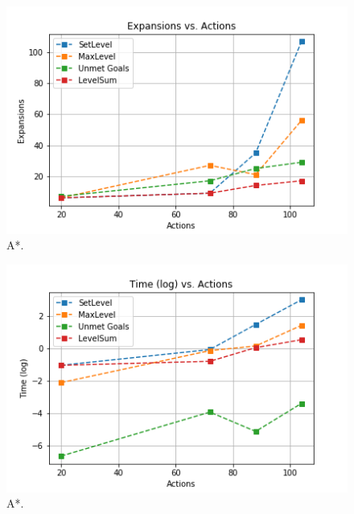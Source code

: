 \documentclass[a4paper]{article}
\begin{document}

\begin{figure}[htpb]
\begin{center}
\includegraphics[width=1\columnwidth]{fig/results_034.png}
\caption{A*.}
\end{center}
\label{fig034}
\end{figure}
        


\begin{figure}[htpb]
\begin{center}
\includegraphics[width=1\columnwidth]{fig/results_031.png}
\caption{A*.}
\end{center}
\label{fig031}
\end{figure}
        
\end{document}
